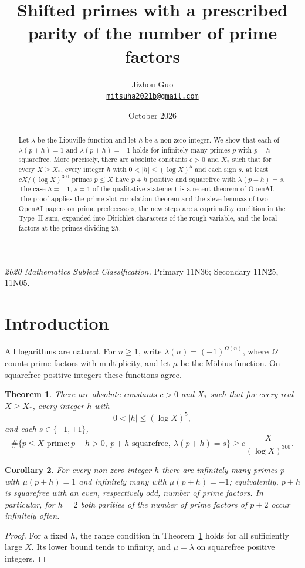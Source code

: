 \documentclass[11pt]{article}
\title{Shifted primes with a prescribed parity of the number of prime factors}
\author{Jizhou Guo\\
  \href{mailto:mitsuha2021b@gmail.com}{\texttt{mitsuha2021b@gmail.com}}}
\date{October 2026}
\newtheorem{theorem}{Theorem}[section]
\newtheorem{corollary}[theorem]{Corollary}
\theoremstyle{definition}
\theoremstyle{definition}
\begin{document}
\maketitle
\begin{abstract}
Let $\lambda$ be the Liouville function and let $h$ be a non-zero integer. We show that each of
$\lambda(p+h)=1$ and $\lambda(p+h)=-1$ holds for infinitely many primes $p$ with $p+h$ squarefree.
More precisely, there are absolute constants $c>0$ and $X_*$ such that for every $X\ge X_*$, every
integer $h$ with $0<|h|\le(\log X)^5$ and each sign $s$, at least $cX/(\log X)^{300}$ primes $p\le X$
have $p+h$ positive and squarefree with $\lambda(p+h)=s$. The case $h=-1$, $s=1$ of the qualitative
statement is a recent theorem of OpenAI. The proof applies the prime-slot correlation theorem and the
sieve lemmas of two OpenAI papers on prime predecessors; the new steps are a coprimality condition in
the Type~II sum, expanded into Dirichlet characters of the rough variable, and the local factors at the
primes dividing $2h$.
\end{abstract}
\noindent\textit{2020 Mathematics Subject Classification.}
Primary 11N36; Secondary 11N25, 11N05.

\section{Introduction}\label{sec:intro}\label{sec:s0}\label{sec:s1}
All logarithms are natural. For $n\ge1$, write
$\lambda(n)=(-1)^{\Omega(n)}$, where $\Omega$ counts prime factors with
multiplicity, and let $\mu$ be the M\"obius function. On squarefree positive
integers these functions agree.

\begin{theorem}\label{thm:main}
There are absolute constants $c>0$ and $X_*$ such that for every real
$X\ge X_*$, every integer $h$ with
\[
0<|h|\le(\log X)^5,
\]
and each $s\in\{-1,+1\}$,
\begin{equation}\tag{G}\label{eq:G}
\#\{p\le X\text{ prime}:p+h>0,\ p+h\text{ squarefree},\
                         \lambda(p+h)=s\}
\ge c\frac{X}{(\log X)^{300}}.
\end{equation}
\end{theorem}

\begin{corollary}\label{cor:fixed-shift}
For every non-zero integer $h$ there are infinitely many primes $p$ with
$\mu(p+h)=1$ and infinitely many with $\mu(p+h)=-1$; equivalently,
$p+h$ is squarefree with an even, respectively odd, number of prime factors.
In particular, for $h=2$ both parities of the number of prime factors of
$p+2$ occur infinitely often.
\end{corollary}
\begin{proof}
For a fixed $h$, the range condition in Theorem~\ref{thm:main} holds for
all sufficiently large $X$. Its lower bound tends to infinity, and
$\mu=\lambda$ on squarefree positive integers.
\end{proof}
\end{document}
